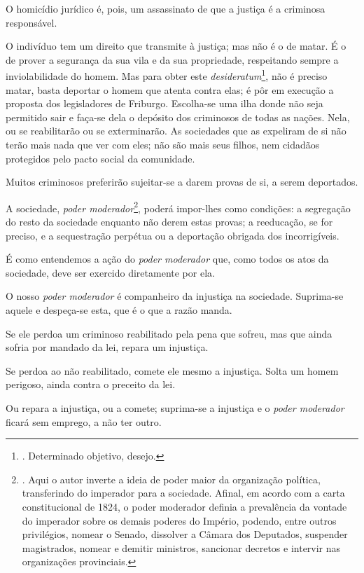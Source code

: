 O homicídio jurídico é, pois, um assassinato de que a justiça é a
criminosa responsável.

O indivíduo tem um direito que transmite à justiça; mas não é o de
matar. É o de prover a segurança da sua vila e da sua propriedade,
respeitando sempre a inviolabilidade do homem. Mas para obter este
\emph{desideratum}\footnote{. Determinado objetivo, desejo.}, não é
preciso matar, basta deportar o homem que atenta contra elas; é pôr em
execução a proposta dos legisladores de Friburgo. Escolha-se uma ilha
donde não seja permitido sair e faça-se dela o depósito dos criminosos
de todas as nações. Nela, ou se reabilitarão ou se exterminarão. As
sociedades que as expeliram de si não terão mais nada que ver com eles;
não são mais seus filhos, nem cidadãos protegidos pelo pacto social da
comunidade.

Muitos criminosos preferirão sujeitar-se a darem provas de si, a serem
deportados.

A sociedade, \emph{poder moderador}\footnote{. Aqui o autor inverte a
  ideia de poder maior da organização política, transferindo do
  imperador para a sociedade. Afinal, em acordo com a carta
  constitucional de 1824, o poder moderador definia a prevalência da
  vontade do imperador sobre os demais poderes do Império, podendo,
  entre outros privilégios, nomear o Senado, dissolver a Câmara dos
  Deputados, suspender magistrados, nomear e demitir ministros,
  sancionar decretos e intervir nas organizações provinciais.}, poderá
impor-lhes como condições: a segregação do resto da sociedade enquanto
não derem estas provas; a reeducação, se for preciso, e a sequestração
perpétua ou a deportação obrigada dos incorrigíveis.

É como entendemos a ação do \emph{poder moderador} que, como todos os
atos da sociedade, deve ser exercido diretamente por ela.

O nosso \emph{poder moderador} é companheiro da injustiça na sociedade.
Suprima-se aquele e despeça-se esta, que é o que a razão manda.

Se ele perdoa um criminoso reabilitado pela pena que sofreu, mas que
ainda sofria por mandado da lei, repara um injustiça.

Se perdoa ao não reabilitado, comete ele mesmo a injustiça. Solta um
homem perigoso, ainda contra o preceito da lei.

Ou repara a injustiça, ou a comete; suprima-se a injustiça e o
\emph{poder moderador} ficará sem emprego, a não ter outro.

